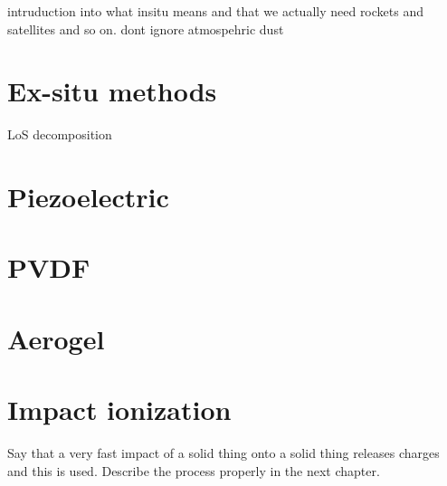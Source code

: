 intruduction into what insitu means and that we actually need rockets and satellites and so on. dont ignore atmospehric dust

\section{Ex-situ methods}

LoS decomposition

\section{Piezoelectric}

\section{PVDF}

\section{Aerogel}

\section{Impact ionization}

Say that a very fast impact of a solid thing onto a solid thing releases charges and this is used. Describe the process properly in the next chapter.